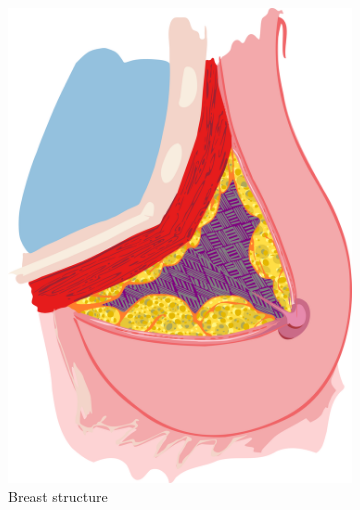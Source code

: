 \begin{figure}
    \centering
    \begin{subfigure}[b]{0.28\textwidth}
        \centering
        \includegraphics[width=\textwidth]{breast}
        \caption{{\small Breast structure}}    
        \label{fig:lesions:breast}
    \end{subfigure}
    \hfill
    \begin{subfigure}[b]{0.25\textwidth}  
        \centering 

\end{subfigure}
\end{figure}
